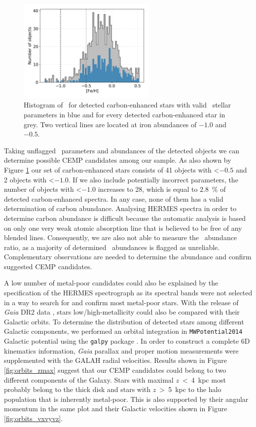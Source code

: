 \begin{figure}
	\centering
	\includegraphics[width=0.6\textwidth]{Fe_H_cannon.png}
	\caption{Histogram of \Feh\ for detected carbon-enhanced stars with valid \TC\ stellar parameters in blue and for every detected carbon-enhanced star in grey. Two vertical lines are located at iron abundances of $-1.0$ and $-0.5$.}
	\label{fig:feh_candidates}
\end{figure}

Taking unflagged \TC\ parameters and abundances of the detected objects we can determine possible CEMP candidates among our sample. As also shown by Figure \ref{fig:feh_candidates} our set of carbon-enhanced stars consists of 41 objects with \Feh \textless $-0.5$ and 2 objects with \Feh \textless $-1.0$. If we also include potentially incorrect parameters, the number of objects with \Feh \textless $-1.0$ increases to 28, which is equal to $2.8$~\% of detected carbon-enhanced spectra. In any case, none of them has a valid determination of carbon abundance. Analysing HERMES spectra in order to determine carbon abundance is difficult because the automatic analysis is based on only one very weak atomic absorption line that is believed to be free of any blended lines. Consequently, we are also not able to measure the \CO\ abundance ratio, as a majority of determined \Cfe\ abundances is flagged as unreliable. Complementary observations are needed to determine the abundance and confirm suggested CEMP candidates.

A low number of metal-poor candidates could also be explained by the specification of the HERMES spectrograph as its spectral bands were not selected in a way to search for and confirm most metal-poor stars. With the release of {\it Gaia} DR2 data \cite{2018A&A...616A...1G}, stars low/high-metallicity could also be compared with their Galactic orbits. To determine the distribution of detected stars among different Galactic components, we performed an orbital integration in \texttt{MWPotential2014} Galactic potential using the \texttt{galpy} package \cite{2015ApJS..216...29B}. In order to construct a complete 6D kinematics information, {\it Gaia} parallax and proper motion measurements were supplemented with the GALAH radial velocities. Results shown in Figure \ref{fig:orbits_zmax} suggest that our CEMP candidates could belong to two different components of the Galaxy. Stars with maximal $z$~<~4~kpc most probably belong to the thick disk and stars with $z$~>~5~kpc to the halo population that is inherently metal-poor. This is also supported by their angular momentum in the same plot and their Galactic velocities shown in Figure \ref{fig:orbits_vxvyvz}.

